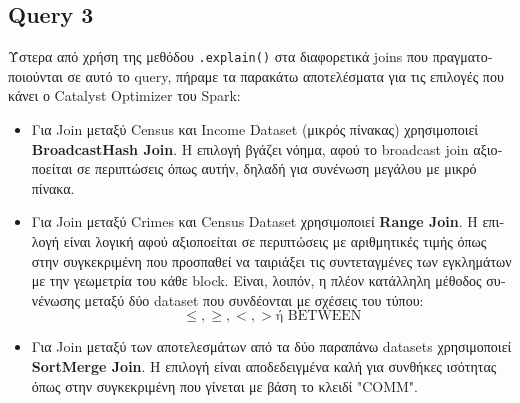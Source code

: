 \documentclass[a4paper,12pt]{article}
\begin{document}
\begin{otherlanguage}{greek}
\section*{Query 3}
	\FloatBarrier
	Ύστερα από χρήση της μεθόδου \texttt{.explain()} στα διαφορετικά joins που πραγματοποιούνται σε αυτό το query, πήραμε τα παρακάτω αποτελέσματα για τις επιλογές που κάνει ο Catalyst Optimizer του Spark:
\begin{itemize}
    \item Για Join μεταξύ Census και Income Dataset (μικρός πίνακας) χρησιμοποιεί \textbf{BroadcastHash Join}. Η επιλογή βγάζει νόημα, αφού το broadcast join αξιοποείται σε περιπτώσεις όπως αυτήν, δηλαδή για συνένωση μεγάλου με μικρό πίνακα.
    \item Για Join μεταξύ Crimes και Census Dataset χρησιμοποιεί \textbf{Range Join}. Η επιλογή είναι λογική αφού αξιοποείται σε περιπτώσεις με αριθμητικές τιμής όπως στην συγκεκριμένη που προσπαθεί να ταιριάξει τις συντεταγμένες των εγκλημάτων με την γεωμετρία του κάθε block. Είναι, λοιπόν, η πλέον κατάλληλη μέθοδος συνένωσης μεταξύ δύο dataset που συνδέονται με σχέσεις του τύπου:\newline
	    $$\leq, \geq, <, > \text{ή BETWEEN}$$
    \item Για Join μεταξύ των αποτελεσμάτων από τα δύο παραπάνω datasets χρησιμοποιεί \textbf{SortMerge Join}. Η επιλογή είναι αποδεδειγμένα καλή για συνθήκες ισότητας όπως στην συγκεκριμένη που γίνεται με βάση το κλειδί "COMM".
\end{itemize}
\vspace{0.3cm}

\end{otherlanguage}
\end{document}
